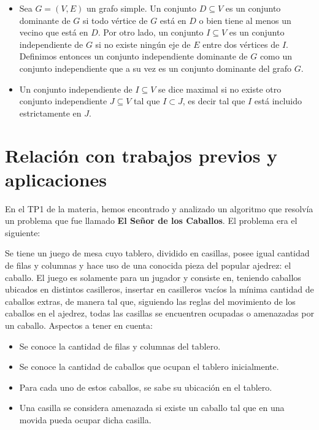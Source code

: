 \documentclass[a4paper]{article}
\begin{document}
\begin{itemize}

\item Sea $G = (V, E)$ un grafo simple. Un conjunto $D \subseteq V$ es un conjunto dominante de $G$ si todo vértice de $G$ está en $D$ o bien tiene al menos un vecino que está en $D$. Por otro lado, un conjunto $I \subseteq V$ es un conjunto independiente de $G$ si no existe ningún eje de $E$ entre dos vértices de $I$. Definimos entonces un conjunto independiente dominante de $G$ como un conjunto independiente que a su vez es un conjunto dominante del grafo $G$.

\item Un conjunto independiente de $I \subseteq V$ se dice maximal si no existe otro conjunto independiente $J \subseteq V$ tal que $I \subset J$, es decir tal que $I$ está incluido estrictamente en $J$. %

\end{itemize}
\vspace*{0.6cm}
\section{Relación con trabajos previos y aplicaciones}
\vspace*{0.3cm}
En el TP1 de la materia, hemos encontrado y analizado un algoritmo que resolvía un problema que fue llamado {\bf El Señor de los Caballos}. El problema era el siguiente:

Se tiene un juego de mesa cuyo tablero, dividido en casillas, posee igual cantidad de filas y columnas y hace uso de una conocida pieza del popular ajedrez: el caballo. El juego es solamente para un jugador y consiste en, teniendo caballos ubicados en distintos casilleros, insertar en casilleros vacíos la mínima cantidad de caballos extras, de manera tal que, siguiendo las reglas del movimiento de los caballos en el ajedrez, todas las casillas se encuentren ocupadas o amenazadas por un caballo.
Aspectos a tener en cuenta:

\begin{itemize}
   \item Se conoce la cantidad de filas y columnas del tablero.
   \item Se conoce la cantidad de caballos que ocupan el tablero inicialmente.
   \item Para cada uno de estos caballos, se sabe su ubicación en el tablero.
   \item Una casilla se considera amenazada si existe un caballo tal que en una movida pueda ocupar dicha casilla.
\end{itemize}
\end{document}

